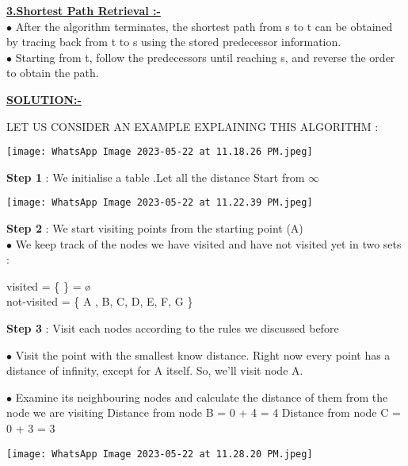 \documentclass[23pt]{article}
\begin{document}
\hypertarget{target:Shortest Path Retrieval}{}

   \item \textbf{\huge\underline{3.Shortest Path Retrieval :-}} \\
   \Large
   $\bullet$ After the algorithm terminates, the shortest path from s to t can be obtained by tracing 	back from t to s using the stored predecessor information.\\
   $\bullet$ Starting from t, follow the predecessors until reaching s, and reverse the order to obtain the path.\\

   \hypertarget{target:SOLUTION}{}
   
   \begin{center}
   \centering  \item \textbf{\huge\underline{SOLUTION:-}}  \\
   \end{center}
LET US CONSIDER AN EXAMPLE EXPLAINING THIS ALGORITHM :
\begin{center}
\texttt{[image: WhatsApp Image 2023-05-22 at 11.18.26 PM.jpeg]}
\end{center}
\Large
\textbf{Step 1} : We initialise a table .Let all the distance Start from $\infty$
\begin{center}
\texttt{[image: WhatsApp Image 2023-05-22 at 11.22.39 PM.jpeg]}
\end{center}

\textbf{Step 2} : We start visiting points from the starting point (A)\\
	$\bullet$ We keep track of the nodes we have visited and have not visited yet in two sets :
		
		visited = \{  \} = \o{} \\
		not-visited = \{ A , B, C, D, E, F, G \}

\textbf{Step 3} : Visit each nodes according to the rules we discussed before

	$\bullet$ Visit the point with the smallest know distance. Right now every point has a distance of infinity, except for A itself. So, we’ll visit node A.
	
	$\bullet$ Examine its neighbouring nodes and calculate the distance of them from the node we are visiting
		Distance from node B = 0 + 4 = 4
		Distance from node C =  0 + 3 = 3
  \begin{center}
\texttt{[image: WhatsApp Image 2023-05-22 at 11.28.20 PM.jpeg]}
\end{center}
\end{document}

